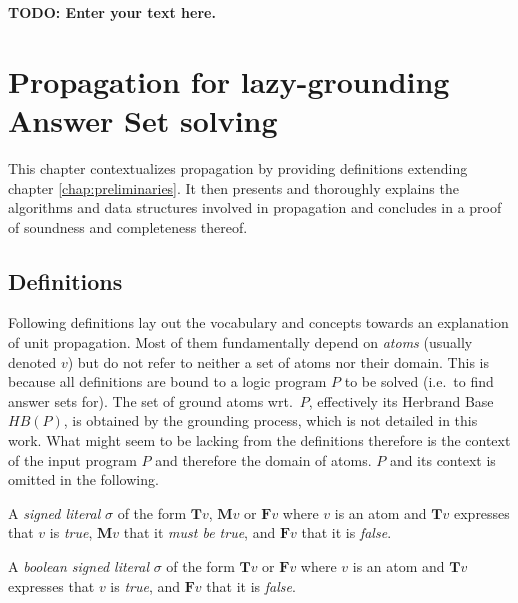 \documentclass{vutinfth} %
\newcommand{\todo}[1]{{\color{red}\textbf{TODO: {#1}}}} %
\theoremstyle{example}
\theoremstyle{definition}
\newtheorem{definition}{Definition}[section]
\theoremstyle{theorem}
\theoremstyle{lemma}
\theoremstyle{corollary}
\begin{document}
\todo{Enter your text here.}

\chapter{Propagation for lazy-grounding Answer Set solving}

This chapter contextualizes propagation by providing definitions extending chapter \ref{chap:preliminaries}. It then presents and thoroughly explains the algorithms and data structures involved in propagation and concludes in a proof of soundness and completeness thereof.

\section{Definitions}


Following definitions lay out the vocabulary and concepts towards an explanation of unit propagation. Most of them fundamentally depend on \emph{atoms} (usually denoted $v$) but do not refer to neither a set of atoms nor their domain. This is because all definitions are bound to a logic program $P$ to be solved (i.e.~to find answer sets for). The set of ground atoms wrt.~$P$, effectively its Herbrand Base $\textit{HB}(P)$, is obtained by the grounding process, which is not detailed in this work. What might seem to be lacking from the definitions therefore is the context of the input program $P$ and therefore the domain of atoms. $P$ and its context is omitted in the following.


A \emph{signed literal} $\sigma$ of the form $\mathbf{T}v$, $\mathbf{M}v$ or $\mathbf{F}v$ where $v$ is an atom and $\mathbf{T}v$ expresses that $v$ is \emph{true}, $\mathbf{M}v$ that it \emph{must be true}, and $\mathbf{F}v$ that it is \emph{false}.

A \emph{boolean signed literal} $\sigma$ of the form $\mathbf{T}v$ or $\mathbf{F}v$ where $v$ is an atom and  $\mathbf{T}v$ expresses that $v$ is \emph{true}, and $\mathbf{F}v$ that it is \emph{false}.
\end{document}
